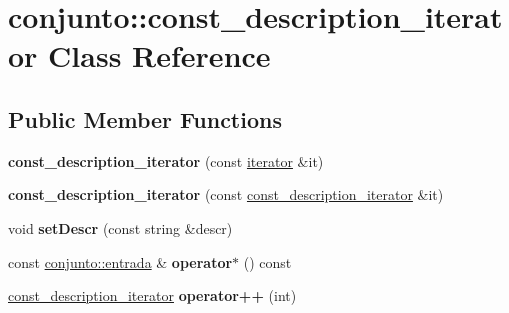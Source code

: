 \hypertarget{classconjunto_1_1const__description__iterator}{\section{conjunto\-:\-:const\-\_\-description\-\_\-iterator Class Reference}
\label{classconjunto_1_1const__description__iterator}
}
\subsection*{Public Member Functions}
\begin{DoxyCompactItemize}
\item 
\hypertarget{classconjunto_1_1const__description__iterator_a8b66174cb9687d3aa9ebbfeb54db8a02}{{\bfseries const\-\_\-description\-\_\-iterator} (const \hyperlink{classconjunto_1_1iterator}{iterator} \&it)}\label{classconjunto_1_1const__description__iterator_a8b66174cb9687d3aa9ebbfeb54db8a02}

\item 
\hypertarget{classconjunto_1_1const__description__iterator_a9cadf7d501cd222b43d0d0df23e2c1e2}{{\bfseries const\-\_\-description\-\_\-iterator} (const \hyperlink{classconjunto_1_1const__description__iterator}{const\-\_\-description\-\_\-iterator} \&it)}\label{classconjunto_1_1const__description__iterator_a9cadf7d501cd222b43d0d0df23e2c1e2}

\item 
\hypertarget{classconjunto_1_1const__description__iterator_af9153b6fbd3d9ba2ec791942a30d06a2}{void {\bfseries set\-Descr} (const string \&descr)}\label{classconjunto_1_1const__description__iterator_af9153b6fbd3d9ba2ec791942a30d06a2}

\item 
\hypertarget{classconjunto_1_1const__description__iterator_a1019941cb755ab1655ca637a3c8c4015}{const \hyperlink{classconjunto_a09cad766dd65de73e51eae21f9d22585}{conjunto\-::entrada} \& {\bfseries operator$\ast$} () const }\label{classconjunto_1_1const__description__iterator_a1019941cb755ab1655ca637a3c8c4015}

\item 
\hypertarget{classconjunto_1_1const__description__iterator_a5dc70298e2f2b3ef16ef12508731a186}{\hyperlink{classconjunto_1_1const__description__iterator}{const\-\_\-description\-\_\-iterator} {\bfseries operator++} (int)}\label{classconjunto_1_1const__description__iterator_a5dc70298e2f2b3ef16ef12508731a186}


\end{DoxyCompactItemize}
